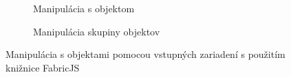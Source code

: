 \begin{figure}
	\centering
	\begin{subfigure}[b]{0.48\linewidth}	
		\caption{Manipulácia s objektom}
		\label{img:fabric-object-selection}
	\end{subfigure}
	\quad
	\begin{subfigure}[b]{0.48\linewidth}	
		\caption{Manipulácia skupiny objektov}
		\label{img:fabric-group-selection}
	\end{subfigure}
	\caption[FabricJS - ukážka manipulácie s objektami]{Manipulácia s objektami pomocou vstupných zariadení s použitím knižnice FabricJS}
\end{figure}
\FloatBarrier


